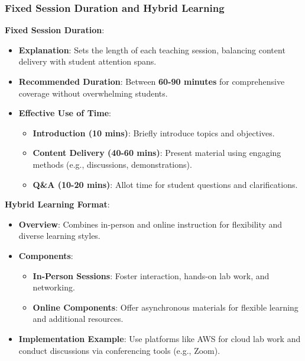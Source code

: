 \documentclass[aspectratio=169]{beamer}
\begin{document}
\begin{frame}[fragile]
    \frametitle{Fixed Session Duration and Hybrid Learning}
    
    \textbf{Fixed Session Duration}:
    \begin{itemize}
        \item \textbf{Explanation}: Sets the length of each teaching session, balancing content delivery with student attention spans.
        
        \item \textbf{Recommended Duration}: Between \textbf{60-90 minutes} for comprehensive coverage without overwhelming students.
        
        \item \textbf{Effective Use of Time}:
        \begin{itemize}
            \item \textbf{Introduction (10 mins)}: Briefly introduce topics and objectives.
            \item \textbf{Content Delivery (40-60 mins)}: Present material using engaging methods (e.g., discussions, demonstrations).
            \item \textbf{Q\&A (10-20 mins)}: Allot time for student questions and clarifications.
        \end{itemize}
    \end{itemize}

    \textbf{Hybrid Learning Format}:
    \begin{itemize}
        \item \textbf{Overview}: Combines in-person and online instruction for flexibility and diverse learning styles.
        
        \item \textbf{Components}:
        \begin{itemize}
            \item \textbf{In-Person Sessions}: Foster interaction, hands-on lab work, and networking.
            \item \textbf{Online Components}: Offer asynchronous materials for flexible learning and additional resources.
        \end{itemize}
        
        \item \textbf{Implementation Example}: Use platforms like AWS for cloud lab work and conduct discussions via conferencing tools (e.g., Zoom).
    \end{itemize}
\end{frame}
\end{document}

